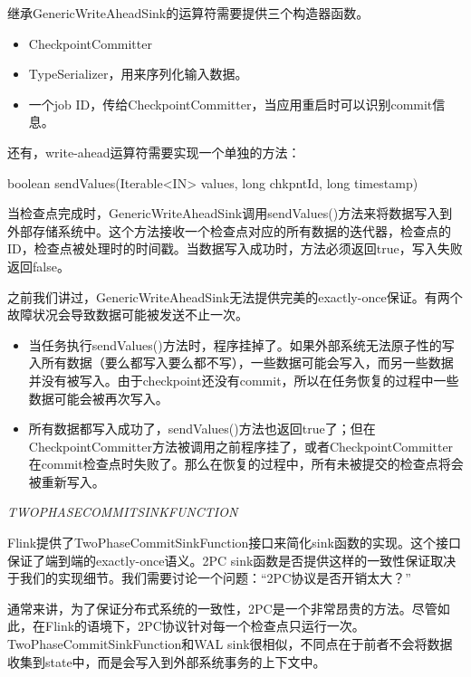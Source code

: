 \documentclass[cn,11pt,chinese]{elegantbook}
\newenvironment{Shaded}{}{}
\newcommand{\BuiltInTok}[1]{#1}
\newcommand{\DataTypeTok}[1]{\textcolor[rgb]{0.56,0.13,0.00}{#1}}
\newcommand{\FunctionTok}[1]{\textcolor[rgb]{0.02,0.16,0.49}{#1}}
\newcommand{\NormalTok}[1]{#1}
\providecommand{\tightlist}{%
  \setlength{\itemsep}{0pt}\setlength{\parskip}{0pt}}
\begin{document}
继承GenericWriteAheadSink的运算符需要提供三个构造器函数。

\begin{itemize}
\tightlist
\item
  CheckpointCommitter
\item
  TypeSerializer，用来序列化输入数据。
\item
  一个job ID，传给CheckpointCommitter，当应用重启时可以识别commit信息。
\end{itemize}

还有，write-ahead运算符需要实现一个单独的方法：

\begin{Shaded}
\begin{Highlighting}[]
\DataTypeTok{boolean} \FunctionTok{sendValues}\NormalTok{(}\BuiltInTok{Iterable}\NormalTok{\textless{}IN\textgreater{} values, }\DataTypeTok{long}\NormalTok{ chkpntId, }\DataTypeTok{long}\NormalTok{ timestamp)}
\end{Highlighting}
\end{Shaded}

当检查点完成时，GenericWriteAheadSink调用sendValues()方法来将数据写入到外部存储系统中。这个方法接收一个检查点对应的所有数据的迭代器，检查点的ID，检查点被处理时的时间戳。当数据写入成功时，方法必须返回true，写入失败返回false。

之前我们讲过，GenericWriteAheadSink无法提供完美的exactly-once保证。有两个故障状况会导致数据可能被发送不止一次。

\begin{itemize}
\tightlist
\item
  当任务执行sendValues()方法时，程序挂掉了。如果外部系统无法原子性的写入所有数据（要么都写入要么都不写），一些数据可能会写入，而另一些数据并没有被写入。由于checkpoint还没有commit，所以在任务恢复的过程中一些数据可能会被再次写入。
\item
  所有数据都写入成功了，sendValues()方法也返回true了；但在CheckpointCommitter方法被调用之前程序挂了，或者CheckpointCommitter在commit检查点时失败了。那么在恢复的过程中，所有未被提交的检查点将会被重新写入。
\end{itemize}

\emph{TWOPHASECOMMITSINKFUNCTION}

Flink提供了TwoPhaseCommitSinkFunction接口来简化sink函数的实现。这个接口保证了端到端的exactly-once语义。2PC
sink函数是否提供这样的一致性保证取决于我们的实现细节。我们需要讨论一个问题：``2PC协议是否开销太大？''

通常来讲，为了保证分布式系统的一致性，2PC是一个非常昂贵的方法。尽管如此，在Flink的语境下，2PC协议针对每一个检查点只运行一次。TwoPhaseCommitSinkFunction和WAL
sink很相似，不同点在于前者不会将数据收集到state中，而是会写入到外部系统事务的上下文中。
\end{document}
